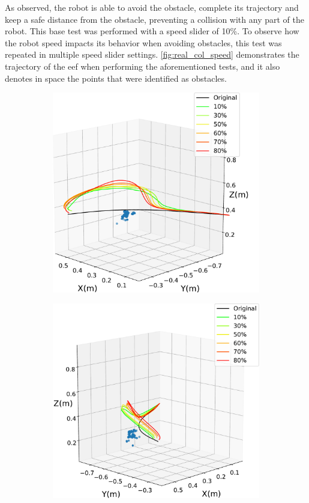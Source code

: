 \par As observed, the robot is able to avoid the obstacle, complete its trajectory and keep a safe distance from the obstacle, preventing a collision with any part of the robot. This base test was performed with a speed slider of 10\%. To observe how the robot speed impacts its behavior when avoiding obstacles, this test was repeated in multiple speed slider settings. \autoref{fig:real_col_speed} demonstrates the trajectory of the \ac{eef} when performing the aforementioned tests, and it also denotes in space the points that were identified as obstacles.

\begin{figure}[h]
    \centering
    \begin{subfigure}{.5\linewidth}
        \centering
        \includegraphics[width=.95\linewidth]{figs/chp6/traj_obstacles_1.pdf}
    \end{subfigure}%
    \begin{subfigure}{.5\linewidth}
        \centering
        \includegraphics[width=.95\linewidth]{figs/chp6/traj_obstacles_2.pdf}

\end{subfigure}
\end{figure}
